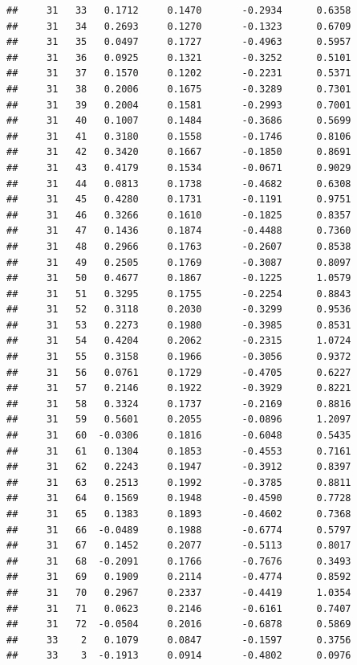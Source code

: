 \documentclass[
]{article}
\begin{document}
\begin{verbatim}
##     31   33   0.1712     0.1470       -0.2934      0.6358  
##     31   34   0.2693     0.1270       -0.1323      0.6709  
##     31   35   0.0497     0.1727       -0.4963      0.5957  
##     31   36   0.0925     0.1321       -0.3252      0.5101  
##     31   37   0.1570     0.1202       -0.2231      0.5371  
##     31   38   0.2006     0.1675       -0.3289      0.7301  
##     31   39   0.2004     0.1581       -0.2993      0.7001  
##     31   40   0.1007     0.1484       -0.3686      0.5699  
##     31   41   0.3180     0.1558       -0.1746      0.8106  
##     31   42   0.3420     0.1667       -0.1850      0.8691  
##     31   43   0.4179     0.1534       -0.0671      0.9029  
##     31   44   0.0813     0.1738       -0.4682      0.6308  
##     31   45   0.4280     0.1731       -0.1191      0.9751  
##     31   46   0.3266     0.1610       -0.1825      0.8357  
##     31   47   0.1436     0.1874       -0.4488      0.7360  
##     31   48   0.2966     0.1763       -0.2607      0.8538  
##     31   49   0.2505     0.1769       -0.3087      0.8097  
##     31   50   0.4677     0.1867       -0.1225      1.0579  
##     31   51   0.3295     0.1755       -0.2254      0.8843  
##     31   52   0.3118     0.2030       -0.3299      0.9536  
##     31   53   0.2273     0.1980       -0.3985      0.8531  
##     31   54   0.4204     0.2062       -0.2315      1.0724  
##     31   55   0.3158     0.1966       -0.3056      0.9372  
##     31   56   0.0761     0.1729       -0.4705      0.6227  
##     31   57   0.2146     0.1922       -0.3929      0.8221  
##     31   58   0.3324     0.1737       -0.2169      0.8816  
##     31   59   0.5601     0.2055       -0.0896      1.2097  
##     31   60  -0.0306     0.1816       -0.6048      0.5435  
##     31   61   0.1304     0.1853       -0.4553      0.7161  
##     31   62   0.2243     0.1947       -0.3912      0.8397  
##     31   63   0.2513     0.1992       -0.3785      0.8811  
##     31   64   0.1569     0.1948       -0.4590      0.7728  
##     31   65   0.1383     0.1893       -0.4602      0.7368  
##     31   66  -0.0489     0.1988       -0.6774      0.5797  
##     31   67   0.1452     0.2077       -0.5113      0.8017  
##     31   68  -0.2091     0.1766       -0.7676      0.3493  
##     31   69   0.1909     0.2114       -0.4774      0.8592  
##     31   70   0.2967     0.2337       -0.4419      1.0354  
##     31   71   0.0623     0.2146       -0.6161      0.7407  
##     31   72  -0.0504     0.2016       -0.6878      0.5869  
##     33    2   0.1079     0.0847       -0.1597      0.3756  
##     33    3  -0.1913     0.0914       -0.4802      0.0976  

\end{verbatim}
\end{document}
